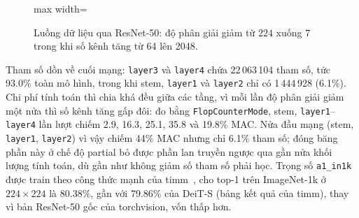 \begin{figure}[htbp]
\centering
\begin{adjustbox}{max width=\linewidth}
\end{adjustbox}
\caption{Luồng dữ liệu qua ResNet-50: độ phân giải giảm từ \(224\) xuống \(7\) trong khi số kênh tăng từ 64 lên 2048.}
\label{fig:a1-resnet}
\end{figure}

Tham số dồn về cuối mạng: \texttt{layer3} và \texttt{layer4} chứa 22\,063\,104 tham số, tức 93.0\% toàn mô hình, trong khi stem, \texttt{layer1} và \texttt{layer2} chỉ có 1\,444\,928 (6.1\%). Chi phí tính toán thì chia khá đều giữa các tầng, vì mỗi lần độ phân giải giảm một nửa thì số kênh tăng gấp đôi: đo bằng \texttt{FlopCounterMode}, stem, \texttt{layer1}--\texttt{layer4} lần lượt chiếm 2.9, 16.3, 25.1, 35.8 và 19.8\% MAC. Nửa đầu mạng (stem, \texttt{layer1}, \texttt{layer2}) vì vậy chiếm 44\% MAC nhưng chỉ 6.1\% tham số; đóng băng phần này ở chế độ partial bỏ được phần lan truyền ngược qua gần nửa khối lượng tính toán, dù gần như không giảm số tham số phải học. Trọng số \texttt{a1\_in1k} được train theo công thức mạnh của timm~\cite{wightman2021rsb}, cho top-1 trên ImageNet-1k ở \(224\times224\) là 80.38\%, gần với 79.86\% của DeiT-S (bảng kết quả của timm), thay vì bản ResNet-50 gốc của torchvision, vốn thấp hơn.

